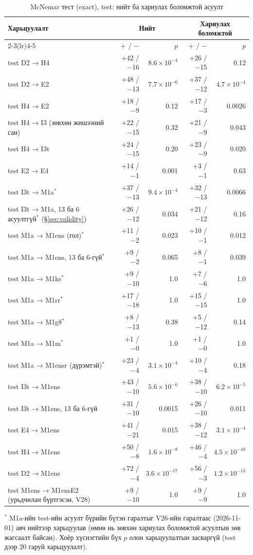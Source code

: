 \begin{table}[H]
\centering\small
\caption{McNemar тест (exact), test: нийт ба хариулах боломжтой асуулт}
\label{tab:mcnemar}
\begin{tabularx}{\textwidth}{X r r r r}
\toprule
Харьцуулалт & \multicolumn{2}{c}{Нийт} & \multicolumn{2}{c}{Хариулах боломжтой} \\
\cmidrule(lr){2-3}\cmidrule(lr){4-5}
 & + / − & $p$ & + / − & $p$ \\
\midrule
test D2 → H4 & +42 / −16 & $8.6 \times 10^{-4}$ & +26 / −15 & 0.12 \\
test D2 → E2 & +48 / −13 & $7.7 \times 10^{-6}$ & +37 / −12 & $4.7 \times 10^{-4}$ \\
test H4 → E2 & +18 / −9 & 0.12 & +17 / −3 & 0.0026 \\
test H4 → I3 (зөвхөн жишээний сан) & +22 / −15 & 0.32 & +21 / −9 & 0.043 \\
test H4 → I3t & +24 / −15 & 0.20 & +23 / −9 & 0.020 \\
test E2 → E4 & +14 / −1 & 0.001 & +3 / −1 & 0.63 \\
test I3t → M1a$^\ast$ & +37 / −13 & $9.4 \times 10^{-4}$ & +32 / −13 & 0.0066 \\
test I3t → M1a, 13 ба 6 асуултгүй$^\ast$ (§\ref{sec:validity}) & +26 / −12 & 0.034 & +21 / −12 & 0.16 \\
\midrule
test M1a → M1ens (гол)$^\ast$ & +11 / −2 & 0.023 & +10 / −1 & 0.012 \\
test M1a → M1ens, 13 ба 6-гүй$^\ast$ & +9 / −2 & 0.065 & +8 / −1 & 0.039 \\
test M1a → M1ks$^\ast$ & +9 / −10 & 1.0 & +7 / −6 & 1.0 \\
test M1a → M1rr$^\ast$ & +17 / −18 & 1.0 & +15 / −15 & 1.0 \\
test M1a → M1g8$^\ast$ & +8 / −13 & 0.38 & +5 / −12 & 0.14 \\
test M1a → M1m$^\ast$ & +1 / −0 & 1.0 & +1 / −0 & 1.0 \\
test M1a → M1ensr (дүрэмтэй)$^\ast$ & +23 / −4 & $3.1 \times 10^{-4}$ & +10 / −4 & 0.18 \\
test I3t → M1ens & +43 / −10 & $5.6 \times 10^{-6}$ & +38 / −10 & $6.2 \times 10^{-5}$ \\
test I3t → M1ens, 13 ба 6-гүй & +31 / −10 & 0.0015 & +26 / −10 & 0.011 \\
test E4 → M1ens & +41 / −21 & 0.015 & +38 / −12 & $3.1 \times 10^{-4}$ \\
test H4 → M1ens & +50 / −8 & $1.6 \times 10^{-8}$ & +46 / −4 & $4.5 \times 10^{-10}$ \\
test D2 → M1ens & +72 / −4 & $3.6 \times 10^{-17}$ & +56 / −3 & $1.2 \times 10^{-13}$ \\
\midrule
test M1ens → M1ensE2 (урьдчилан бүртгэсэн, V28) & +9 / −10 & 1.0 & +9 / −9 & 1.0 \\
\bottomrule
\end{tabularx}
\par\smallskip\footnotesize $^\ast$ M1a-ийн test-ийн асуулт бүрийн бүтэн гаралтыг V26-ийн гаралтаас (2026-11-01) авч нийтээр
харьцуулав (өмнө нь зөвхөн хариулах боломжтой асуултын зөв жагсаалт байсан). Хоёр хүснэгтийн бүх $p$ олон харьцуулалтын засваргүй (test дээр
20 гаруй харьцуулалт).
\end{table}

